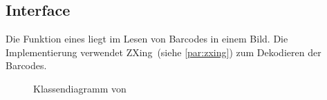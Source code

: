 \subsection{Interface }
Die Funktion eines  liegt im Lesen von Barcodes in einem Bild.
Die Implementierung  verwendet ZXing~(siehe \autoref{par:zxing}) zum Dekodieren der Barcodes.


\begin{figure}[h]
  \centering
  \caption{Klassendiagramm von }
\end{figure}

